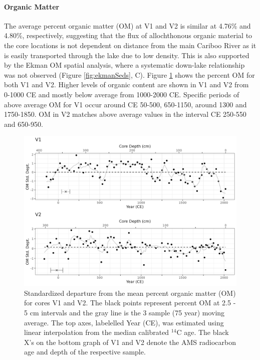 \documentclass[Royal,times,doublespace,sageh]{sagej}
\begin{document}
\hypertarget{organic-matter}{%
\paragraph{Organic Matter}\label{organic-matter}}

The average percent organic matter (OM) at V1 and V2 is similar at
4.76\% and 4.80\%, respectively, suggesting that the flux of
allochthonous organic material to the core locations is not dependent on
distance from the main Cariboo River as it is easily transported through
the lake due to low density. This is also supported by the Ekman OM
spatial analysis, where a systematic down-lake relationship was not
observed (Figure \ref{fig:ekmanSeds}, C). Figure \ref{fig:loi} shows the
percent OM for both V1 and V2. Higher levels of organic content are
shown in V1 and V2 from 0-1000 CE and mostly below average from
1000-2000 CE. Specific periods of above average OM for V1 occur around
CE 50-500, 650-1150, around 1300 and 1750-1850. OM in V2 matches above
average values in the interval CE 250-550 and 650-950.

\begin{figure}

{\centering \includegraphics[width=1\linewidth]{figs/V1_V2_LOI_vs_depth_and_C14_est_yr} 

}

\caption{Standardized departure from the mean percent organic matter (OM) for cores V1 and V2. The black points represent percent OM at 2.5 - 5 cm intervals and the gray line is the 3 sample (75 year) moving average. The top axes, labelelled Year (CE), was estimated using linear interpolation from the median calibrated $^{14}$C age. The black X's on the bottom graph of V1 and V2 denote the AMS radiocarbon age and depth of the respective sample.\label{loi}}\label{fig:loi}
\end{figure}
\end{document}
